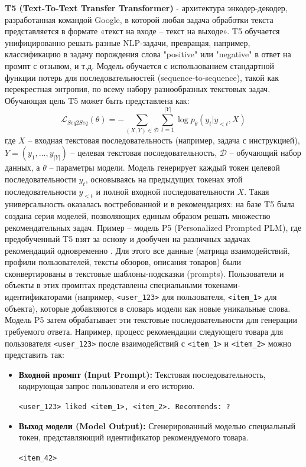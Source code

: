 \textbf{T5 (Text-To-Text Transfer Transformer)} - архитектура энкодер-декодер, разработанная командой Google, в которой любая задача обработки текста представляется в формате «текст на входе – текст на выходе». T5 обучается унифицированно решать разные NLP-задачи, превращая, например, классификацию в задачу порождения слова "positive" или "negative" в ответ на промпт с отзывом, и т.д. Модель обучается с использованием стандартной функции потерь для последовательностей (sequence-to-sequence), такой как перекрестная энтропия, по всему набору разнообразных текстовых задач. Обучающая цель T5 может быть представлена как:
\[ \mathcal{L}_{Seq2Seq}(\theta) = - \sum_{(X, Y) \in \mathcal{D}} \sum_{t=1}^{|Y|} \log p_\theta(y_t | y_{<t}, X) \]
где \(X\) – входная текстовая последовательность (например, задача с инструкцией), \(Y = (y_1, \dots, y_{|Y|})\) – целевая текстовая последовательность, \(\mathcal{D}\) – обучающий набор данных, а \(\theta\) – параметры модели. Модель генерирует каждый токен целевой последовательности \(y_t\), основываясь на предыдущих токенах этой последовательности \(y_{<t}\) и полной входной последовательности \(X\). Такая универсальность оказалась востребованной и в рекомендациях: на базе T5 была создана серия моделей, позволяющих единым образом решать множество рекомендательных задач. Пример – модель P5 (Personalized Prompted PLM), где предобученный T5 взят за основу и дообучен на различных задачах рекомендаций одновременно \citep{geng2022recommendationaslanguageprocessing}. Для этого все данные (матрица взаимодействий, профили пользователей, тексты обзоров, описания товаров) были сконвертированы в текстовые шаблоны-подсказки (prompts). Пользователи и объекты в этих промптах представлены специальными токенами-идентификаторами (например, \texttt{<user\_123>} для пользователя, \texttt{<item\_1>} для объекта), которые добавляются в словарь модели как новые уникальные слова. Модель P5 затем обрабатывает эти текстовые последовательности для генерации требуемого ответа. Например, процесс рекомендации следующего товара для пользователя \texttt{<user\_123>} после взаимодействий с \texttt{<item\_1>} и \texttt{<item\_2>} можно представить так:
\begin{itemize}
    \item \textbf{Входной промпт (Input Prompt):} Текстовая последовательность, кодирующая запрос пользователя и его историю.
    \begin{center}
    \texttt{<user\_123> liked <item\_1>, <item\_2>. Recommends: ?}
    \end{center}
    \item \textbf{Выход модели (Model Output):} Сгенерированный моделью специальный токен, представляющий идентификатор рекомендуемого товара.
    \begin{center}
    \texttt{<item\_42>}
    \end{center}
\end{itemize}
